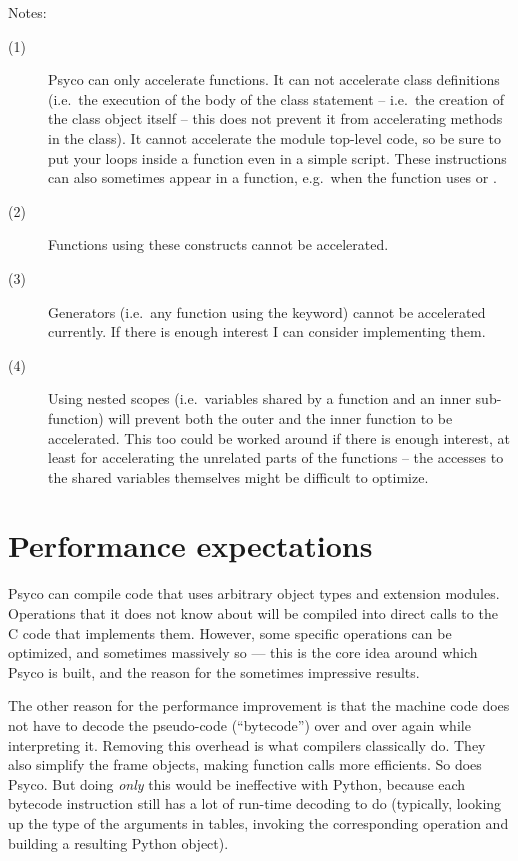 \documentclass{manual}
\begin{document}
\noindent
Notes:
%
\begin{description}
\item[(1)]
  Psyco can only accelerate functions.  It can not accelerate class definitions (i.e.\ the execution of the body of the class statement -- i.e.\ the creation of the class object itself -- this does not prevent it from accelerating methods in the class).  It cannot accelerate the module top-level code, so be sure to put your loops inside a function even in a simple script.  These instructions can also sometimes appear in a function, e.g.\ when the function uses  or .
\item[(2)]
  Functions using these constructs cannot be accelerated.
\item[(3)]
  Generators (i.e.\ any function using the  keyword) cannot be accelerated currently.  If there is enough interest I can consider implementing them.
\item[(4)]
  Using nested scopes (i.e.\ variables shared by a function and an inner sub-function) will prevent both the outer and the inner function to be accelerated.  This too could be worked around if there is enough interest, at least for accelerating the unrelated parts of the functions -- the accesses to the shared variables themselves might be difficult to optimize.
\end{description}


\chapter{Performance expectations}

Psyco can compile code that uses arbitrary object types and extension modules.  Operations that it does not know about will be compiled into direct calls to the C code that implements them.  However, some specific operations can be optimized, and sometimes massively so --- this is the core idea around which Psyco is built, and the reason for the sometimes impressive results.

The other reason for the performance improvement is that the machine code does not have to decode the pseudo-code (``bytecode'') over and over again while interpreting it.  Removing this overhead is what compilers classically do.  They also simplify the frame objects, making function calls more efficients.  So does Psyco.  But doing \emph{only} this would be ineffective with Python, because each bytecode instruction still has a lot of run-time decoding to do (typically, looking up the type of the arguments in tables, invoking the corresponding operation and building a resulting Python object).
\end{document}
